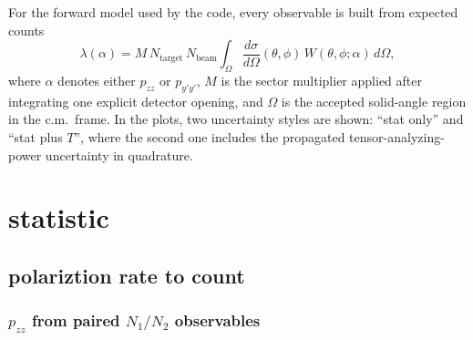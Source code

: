 \documentclass[11pt,a4paper]{article}
\begin{document}
For the forward model used by the code, every observable is built from expected counts
\begin{equation}
\label{eq:count_forward_model}
    \lambda(\alpha) =
    M\,N_{\mathrm{target}}\,N_{\mathrm{beam}}
    \int_{\Omega}
    \frac{d\sigma}{d\Omega}(\theta,\phi)\,
    W(\theta,\phi;\alpha)\,d\Omega,
\end{equation}
where $\alpha$ denotes either $p_{zz}$ or $p_{y'y'}$, $M$ is the sector multiplier applied after integrating one explicit detector opening, and $\Omega$ is the accepted solid-angle region in the c.m.\ frame. In the plots, two uncertainty styles are shown: ``stat only'' and ``stat plus $T$'', where the second one includes the propagated tensor-analyzing-power uncertainty in quadrature.

\section{statistic}

\subsection{polariztion rate to count}
\label{sec:forward_counts}

\subsubsection{\texorpdfstring{$p_{zz}$ from paired $N_1/N_2$ observables}{pzz from paired N1/N2 observables}}
\end{document}
